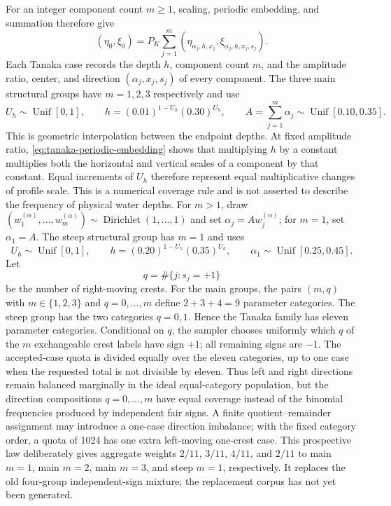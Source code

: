 \documentclass[11pt]{article}
\begin{document}
For an integer component count $m\geq1$, scaling, periodic embedding, and
summation therefore give
\begin{equation}
  (\eta_0,\xi_0)
  =P_K\sum_{j=1}^{m}
   (\eta_{\alpha_j,h,x_j},\xi_{\alpha_j,h,x_j,s_j}).
  \label{eq:tanaka-constructor}
\end{equation}
Each Tanaka case records the depth $h$, component count $m$, and the amplitude
ratio, center, and direction $(\alpha_j,x_j,s_j)$ of every component.
The three main structural groups have $m=1,2,3$ respectively and use
\begin{equation}
  U_h\sim\operatorname{Unif}[0,1],
  \qquad
  h=(0.01)^{1-U_h}(0.30)^{U_h},
  \qquad
  A=\sum_{j=1}^m\alpha_j\sim\operatorname{Unif}[0.10,0.35].
  \label{eq:tanaka-main-laws}
\end{equation}
This is geometric interpolation between the endpoint depths.  At fixed
amplitude ratio, \eqref{eq:tanaka-periodic-embedding} shows that multiplying
$h$ by a constant multiplies both the horizontal and vertical scales of a
component by that constant.  Equal increments of $U_h$ therefore represent
equal multiplicative changes of profile scale.  This is a numerical coverage
rule and is not asserted to describe the frequency of physical water depths.
For $m>1$, draw
$(w_1^{(\alpha)},\ldots,w_m^{(\alpha)})
\sim\operatorname{Dirichlet}(1,\ldots,1)$ and set
$\alpha_j=Aw_j^{(\alpha)}$; for $m=1$, set $\alpha_1=A$.
The steep structural group has $m=1$ and uses
\begin{equation}
  U_h\sim\operatorname{Unif}[0,1],
  \qquad
  h=(0.20)^{1-U_h}(0.35)^{U_h},
  \qquad
  \alpha_1\sim\operatorname{Unif}[0.25,0.45].
  \label{eq:tanaka-steep-laws}
\end{equation}
Let
\begin{equation}
  q=\#\{j:s_j=+1\}
  \label{eq:tanaka-right-moving-count}
\end{equation}
be the number of right-moving crests.  For the main groups, the pairs
$(m,q)$ with $m\in\{1,2,3\}$ and $q=0,\ldots,m$ define
$2+3+4=9$ parameter categories.  The steep group has the two categories
$q=0,1$.  Hence the Tanaka family has eleven parameter categories.
Conditional on $q$, the sampler chooses uniformly which $q$ of the $m$
exchangeable crest labels have sign $+1$; all remaining signs are $-1$.
The accepted-case quota is divided equally over the eleven categories, up to
one case when the requested total is not divisible by eleven.  Thus left and
right directions remain balanced marginally in the ideal equal-category
population, but the direction compositions $q=0,\ldots,m$ have equal coverage
instead of the binomial frequencies produced by independent fair signs.  A
finite quotient--remainder assignment may introduce a one-case direction
imbalance; with the fixed category order, a quota of 1024 has one extra
left-moving one-crest case.  This prospective law deliberately gives
aggregate weights $2/11$, $3/11$, $4/11$, and $2/11$ to main $m=1$, main
$m=2$, main $m=3$, and steep $m=1$, respectively.  It replaces the old
four-group independent-sign mixture; the replacement corpus has not yet been
generated.
\end{document}
